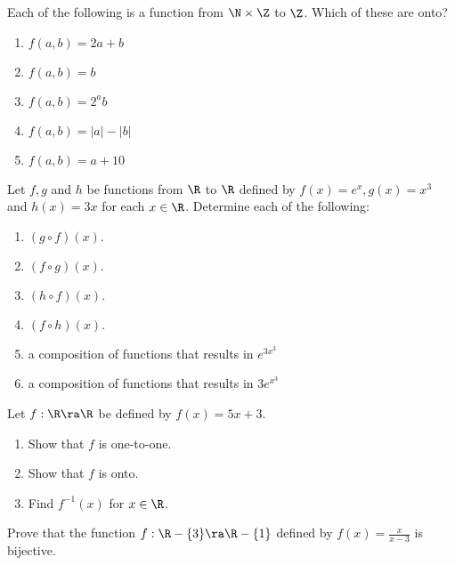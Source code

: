 \documentclass{homework}
\begin{document}
\question Each of the following is a function from $\N \times \Z$ to $\Z$. Which of these are onto?
\begin{enumerate}[label=(\alph*)]
    \item $f(a, b) = 2a + b$
    \item $f(a, b) = b$
    \item $f(a, b) = 2^ab$
    \item $f(a, b) = |a|-|b|$
    \item $f(a, b) = a+10$
\end{enumerate}

\question Let $f, g$ and $h$ be functions from $\R$ to $\R$ deﬁned by $f(x) = e^x, g(x) = x^3$ and $h(x) = 3x$ for each $x \in \R$. Determine each of the following:
\begin{enumerate}[label=(\alph*)]
    \item $(g \circ f )(x).$
    \item $(f \circ g)(x).$
    \item $(h \circ f )(x).$
    \item $(f \circ h)(x).$
    \item a composition of functions that results in $e^{3x^3}$
    \item a composition of functions that results in $3e^{x^3}$
\end{enumerate}

\question Let $f: \R \ra \R$ be deﬁned by $f(x) = 5x + 3$.
\begin{enumerate}
    \item Show that $f$ is one-to-one.
    \item Show that $f$ is onto.
    \item Find $f^{-1}(x)$ for $x \in \R$.
\end{enumerate}

\question Prove that the function $f:\R-\{3\} \ra \R - \{1\}$ deﬁned by $f(x)=\frac{x}{x-3}$ is bijective.

\end{document}
